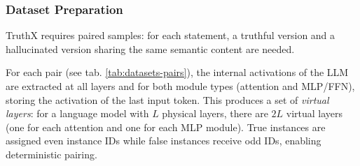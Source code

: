 \subsubsection{Dataset Preparation}

TruthX requires paired samples: for each statement, a truthful version and a hallucinated version sharing the same semantic content are needed.

For each pair (see tab. \ref{tab:datasets-pairs}), the internal activations of the LLM are extracted at all layers and for both module types (attention and MLP/FFN), storing the activation of the last input token. This produces a set of \textit{virtual layers}: for a language model with $L$ physical layers, there are $2L$ virtual layers (one for each attention and one for each MLP module). True instances are assigned even instance IDs while false instances receive odd IDs, enabling deterministic pairing.

